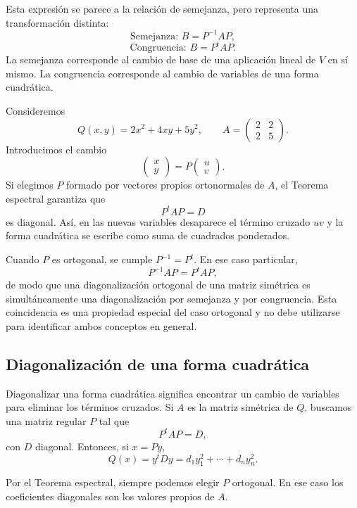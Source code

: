 Esta expresión se parece a la relación de semejanza, pero representa una transformación distinta:
\[
\boxed{\text{Semejanza: }B=P^{-1}AP,}
\]
\[
\boxed{\text{Congruencia: }B=P^tAP.}
\]
La semejanza corresponde al cambio de base de una aplicación lineal de $V$ en sí mismo. La congruencia corresponde al cambio de variables de una forma cuadrática.

\begin{example}
Consideremos
\[
Q(x,y)=2x^2+4xy+5y^2,
\qquad
A=\begin{pmatrix}2&2\\2&5\end{pmatrix}.
\]
Introducimos el cambio
\[
\begin{pmatrix}x\\y\end{pmatrix}
=P\begin{pmatrix}u\\v\end{pmatrix}.
\]
Si elegimos $P$ formado por vectores propios ortonormales de $A$, el Teorema espectral garantiza que
\[
P^tAP=D
\]
es diagonal. Así, en las nuevas variables desaparece el término cruzado $uv$ y la forma cuadrática se escribe como suma de cuadrados ponderados.
\end{example}

Cuando $P$ es ortogonal, se cumple $P^{-1}=P^t$. En ese caso particular,
\[
P^{-1}AP=P^tAP,
\]
de modo que una diagonalización ortogonal de una matriz simétrica es simultáneamente una diagonalización por semejanza y por congruencia. Esta coincidencia es una propiedad especial del caso ortogonal y no debe utilizarse para identificar ambos conceptos en general.

\subsection{Diagonalización de una forma cuadrática}

Diagonalizar una forma cuadrática significa encontrar un cambio de variables para eliminar los términos cruzados. Si $A$ es la matriz simétrica de $Q$, buscamos una matriz regular $P$ tal que
\[
P^tAP=D,
\]
con $D$ diagonal. Entonces, si $x=Py$,
\[
Q(x)=y^tDy
=d_1y_1^2+\cdots+d_ny_n^2.
\]

Por el Teorema espectral, siempre podemos elegir $P$ ortogonal. En ese caso los coeficientes diagonales son los valores propios de $A$.

